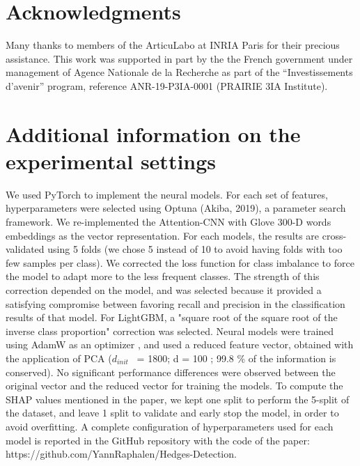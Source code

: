 \documentclass[11pt]{article}
\begin{document}
\section*{\textbf{Acknowledgments}}
Many thanks to members of the ArticuLabo at INRIA Paris for their precious assistance. This work was supported in part by the the French government under management of Agence Nationale de la Recherche as part of the “Investissements d’avenir” program, reference ANR-19-P3IA-0001 (PRAIRIE 3IA Institute). 




\newpage

\appendix

\section{Additional information on the experimental settings}
\label{appendix:Parameters}

\noindent We used PyTorch \cite{Paszke2019} to implement the neural models. For each set of features, hyperparameters were selected using Optuna (Akiba, 2019), a parameter search framework. We re-implemented the Attention-CNN with Glove \cite{pennington2014glove} 300-D words embeddings as the vector representation. For each models, the results are cross-validated using 5 folds (we chose 5 instead of 10 to avoid having folds with too few samples per class). We corrected the loss function for class imbalance to force the model to adapt more to the less frequent classes. The strength of this correction depended on the model, and was selected because it provided a satisfying compromise between favoring recall and precision in the classification results of that model. For LightGBM, a "square root of the square root of the inverse class proportion" correction was selected. Neural models were trained using AdamW as an optimizer \cite{Loshchilov2018}, and used a reduced feature vector, obtained with the application of PCA ($d_{init}$ ~= 1800; d = 100 ; 99.8 {\%} of the information is conserved). No significant performance differences were observed between the original vector and the reduced vector for training the models. To compute the SHAP values mentioned in the paper, we kept one split to perform the 5-split of the dataset, and leave 1 split to validate and early stop the model, in order to avoid overfitting. A complete configuration of hyperparameters used for each model is reported in the GitHub repository with the code of the paper: https://github.com/YannRaphalen/Hedges-Detection.
\end{document}
